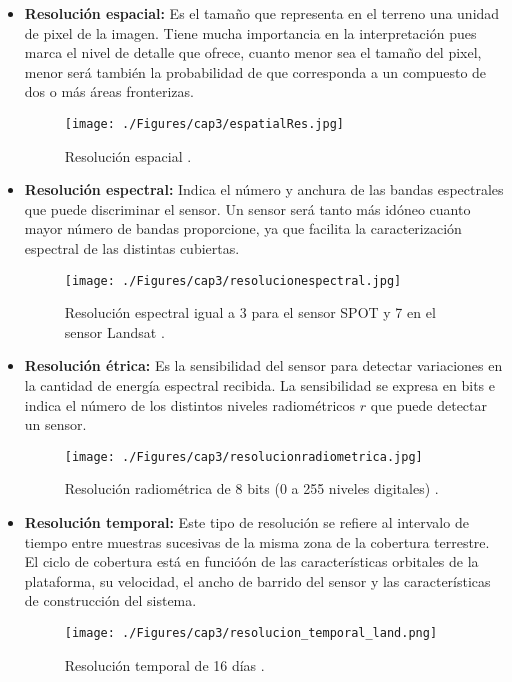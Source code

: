 \begin{itemize}
		\item \textbf{Resoluci\'on espacial:} Es el tama\~{n}o que representa en el terreno una unidad de pixel de la imagen. Tiene mucha importancia en la interpretaci\'on pues marca el nivel de detalle que ofrece, cuanto menor sea el tama\~{n}o del pixel, menor ser\'a tambi\'en la probabilidad de que corresponda a un compuesto de dos o m\'as \'areas fronterizas.
		\begin{figure}[H]
			\centering
			\texttt{[image: ./Figures/cap3/espatialRes.jpg]}
			\caption{Resoluci\'on espacial \cite{chara2015sate}.}
			\label{fig:espatialRes}
		\end{figure}
			\item \textbf{Resoluci\'on espectral:} Indica el n\'umero y anchura de las bandas espectrales que puede discriminar el sensor. Un sensor ser\'a tanto m\'as id\'oneo cuanto mayor n\'umero de bandas proporcione, ya que facilita la caracterizaci\'on espectral de las distintas cubiertas.
				\begin{figure}[H]
					\centering
					\texttt{[image: ./Figures/cap3/resolucionespectral.jpg]}
					\caption{Resoluci\'on espectral igual a 3 para el sensor SPOT y 7 en el sensor Landsat \cite{chara2015sate}.}
					\label{fig:espectralRes}
				\end{figure}
		\item \textbf{Resoluci\'on \'etrica:} Es la sensibilidad del sensor para detectar variaciones en la cantidad de energ\'ia espectral recibida. La sensibilidad se expresa en bits e indica el n\'umero de los distintos niveles radiom\'etricos $ r $ que puede detectar un sensor.
						\begin{figure}[H]
							\centering
							\texttt{[image: ./Figures/cap3/resolucionradiometrica.jpg]}
							\caption{Resoluci\'on radiom\'etrica de 8 bits (0 a 255 niveles digitales) \cite{chara2015sate}.}
							\label{fig:radioRes}
						\end{figure}
		\item \textbf{Resoluci\'on temporal:} Este tipo de resoluci\'on se refiere al intervalo de tiempo entre muestras sucesivas de la misma zona de la cobertura terrestre. El ciclo de cobertura est\'a en funció\'on de las caracter\'isticas orbitales de la plataforma, su velocidad, el ancho de barrido del sensor y las caracter\'isticas de construcci\'on del sistema.
			\begin{figure}[H]
					\centering
					\texttt{[image: ./Figures/cap3/resolucion\_temporal\_land.png]}
					\caption{Resoluci\'on temporal de 16 d\'ias \cite{teledet2015Combi}.}
					\label{fig:temporaRes}
				\end{figure}
	\end{itemize}

